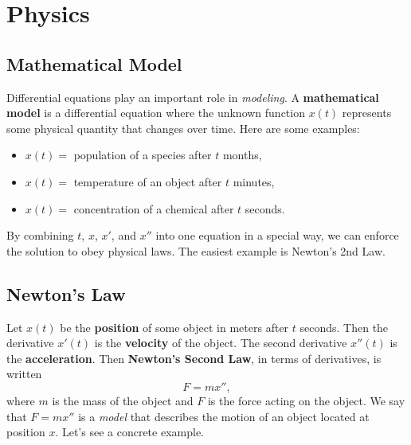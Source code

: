 \documentclass[letterpaper]{article}
\begin{document}


\section{Physics}

\subsection{Mathematical Model}

Differential equations play an important role in \textit{modeling}. A \textbf{mathematical model} is a differential equation where the unknown function $x(t)$ represents some physical quantity that changes over time. Here are some examples:
\begin{itemize}
    \item $x(t)=$ population of a species after $t$ months,
    \item $x(t)=$ temperature of an object after $t$ minutes,
    \item $x(t)=$ concentration of a chemical after $t$ seconds.
\end{itemize}
By combining $t$, $x$, $x'$, and $x''$ into one equation in a special way, we can enforce the solution to obey physical laws. The easiest example is Newton's 2nd Law.

\subsection{Newton's Law}
Let $x(t)$ be the \textbf{position} of some object in meters after $t$ seconds. Then the derivative $x'(t)$ is the \textbf{velocity} of the object. The second derivative $x''(t)$ is the \textbf{acceleration}. Then \textbf{Newton's Second Law}, in terms of derivatives, is written 
\[
F =mx'',
\]
where $m$ is the mass of the object and $F$ is the force acting on the object. We say that $F=mx''$ is a \textit{model} that describes the motion of an object located at position $x$. Let's see a concrete example.
\end{document}

